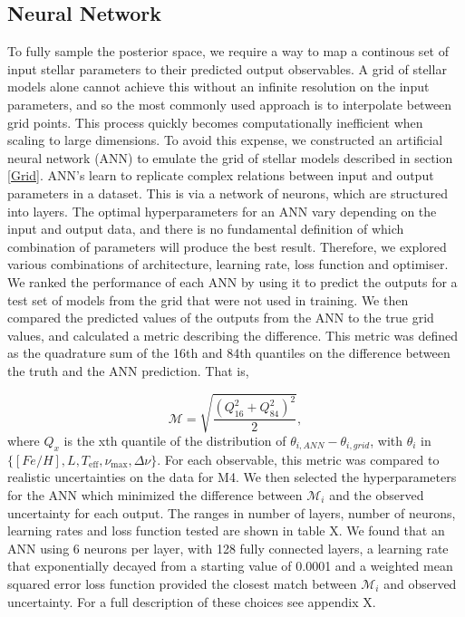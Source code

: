 \documentclass[fleqn,usenatbib]{mnras}
\newcommand{\numax}{\nu_{\mathrm{max}}}
\newcommand{\Dnu}{\Delta\nu}
\begin{document}
\subsection{Neural Network}
To fully sample the posterior space, we require a way to map a continous set of input stellar parameters to their predicted output observables. A grid of stellar models alone cannot achieve this without an infinite resolution on the input parameters, and so the most commonly used approach is to interpolate between grid points. This process quickly becomes computationally inefficient when scaling to large dimensions. To avoid this expense, we constructed an artificial neural network (ANN) to emulate the grid of stellar models described in section \ref{Grid}. 
ANN's learn to replicate complex relations between input and output parameters in a dataset. This is via a network of neurons, which are structured into layers. 
The optimal hyperparameters for an ANN vary depending on the input and output data, and there is no fundamental definition of which combination of parameters will produce the best result. Therefore, we explored various combinations of architecture, learning rate, loss function and optimiser. We ranked the performance of each ANN by using it to predict the outputs for a test set of models from the grid that were not used in training. We then compared the predicted values of the outputs from the ANN to the true grid values, and calculated a metric describing the difference. This metric was defined as the quadrature sum of the 16th and 84th quantiles on the difference between the truth and the ANN prediction. That is, 

\begin{equation}
    \mathcal{M} = \sqrt{\frac{(Q_{16}^2 + Q_{84}^2)^2}{2}},
\end{equation}
where $Q_x$ is the xth quantile of the distribution of $\theta_{i, ANN} - \theta_{i, grid}$, with $\theta_{i}$ in $\{[Fe/H], L, T_{\mathrm{eff}}, \numax, \Dnu\}$. For each observable, this metric was compared to realistic uncertainties on the data for M4. We then selected the hyperparameters for the ANN which minimized the difference between $\mathcal{M}_{i}$ and the observed uncertainty for each output. 
The ranges in number of layers, number of neurons, learning rates and loss function tested are shown in table X. We found that an ANN using 6 neurons per layer, with 128 fully connected layers, a learning rate that exponentially decayed from a starting value of 0.0001 and a weighted mean squared error loss function provided the closest match between $\mathcal{M}_{i}$ and observed uncertainty. For a full description of these choices see appendix X. 
\end{document}

